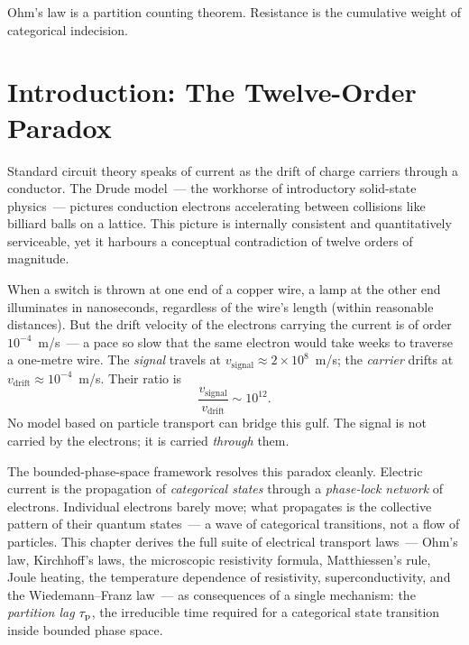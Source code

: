 
\epigraph{%
  Ohm's law is a partition counting theorem.%
  Resistance is the cumulative weight of categorical indecision.%
}{}

\section{Introduction: The Twelve-Order Paradox}
\label{sec:ch18-intro}

Standard circuit theory speaks of current as the drift of charge carriers
through a conductor.  The Drude model~--- the workhorse of introductory
solid-state physics~--- pictures conduction electrons accelerating between
collisions like billiard balls on a lattice.  This picture is internally
consistent and quantitatively serviceable, yet it harbours a conceptual
contradiction of twelve orders of magnitude.

When a switch is thrown at one end of a copper wire, a lamp at the other
end illuminates in nanoseconds, regardless of the wire's length (within
reasonable distances).  But the drift velocity of the electrons carrying
the current is of order $10^{-4}$~m/s~--- a pace so slow that the same
electron would take weeks to traverse a one-metre wire.  The \emph{signal}
travels at $v_{\mathrm{signal}} \approx 2\times 10^8$~m/s; the
\emph{carrier} drifts at $v_{\mathrm{drift}} \approx 10^{-4}$~m/s.  Their
ratio is
\begin{equation}
  \frac{v_{\mathrm{signal}}}{v_{\mathrm{drift}}} \sim 10^{12}.
  \label{eq:ch18-paradox}
\end{equation}
No model based on particle transport can bridge this gulf.  The signal is
not carried by the electrons; it is carried \emph{through} them.

The bounded-phase-space framework resolves this paradox cleanly.  Electric
current is the propagation of \emph{categorical states} through a
\emph{phase-lock network} of electrons.  Individual electrons barely move;
what propagates is the collective pattern of their quantum states~--- a
wave of categorical transitions, not a flow of particles.  This chapter
derives the full suite of electrical transport laws~--- Ohm's law,
Kirchhoff's laws, the microscopic resistivity formula, Matthiessen's rule,
Joule heating, the temperature dependence of resistivity, superconductivity,
and the Wiedemann--Franz law~--- as consequences of a single mechanism:
the \emph{partition lag} $\tau_{\mathrm{p}}$, the irreducible time required for a
categorical state transition inside bounded phase space.

